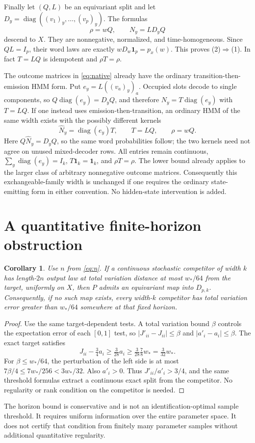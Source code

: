 \documentclass[11pt]{article}
\newtheorem{corollary}[theorem]{Corollary}
\theoremstyle{remark}\newtheorem{remark}[theorem]{Remark}
\newcommand{\one}{\mathbf 1}
\newcommand{\diag}{\operatorname{diag}}
\begin{document}
Finally let $(Q,L)$ be an equivariant split and let $D_y=\diag((v_1)_y,\ldots,(v_p)_y)$. The formulas
\begin{equation}\label{eq:native}
 \rho=wQ,\qquad N_y=LD_yQ
\end{equation}
descend to $X$. They are nonnegative, normalized, and time-homogeneous. Since $QL=I_p$, their word laws are exactly $wD_w\one_p=p_x(w)$. This proves (2)$\Rightarrow$(1). In fact $T=LQ$ is idempotent and $\rho T=\rho$.

The outcome matrices in \eqref{eq:native} already have the ordinary transition-then-emission HMM form. Put $e_y=L((v_a)_y)_a$. Occupied slots decode to single components, so $Q\diag(e_y)=D_yQ$, and therefore $N_y=T\diag(e_y)$ with $T=LQ$. If one instead uses emission-then-transition, an ordinary HMM of the same width exists with the possibly different kernels
\[
 \widehat N_y=\diag(e_y)T,\qquad T=LQ,\qquad\rho=wQ.
\]
Here $Q\widehat N_y=D_yQ$, so the same word probabilities follow; the two kernels need not agree on unused mixed-decoder rows. All entries remain continuous, $\sum_y\diag(e_y)=I_k$, $T\one_k=\one_k$, and $\rho T=\rho$. The lower bound already applies to the larger class of arbitrary nonnegative outcome matrices. Consequently this exchangeable-family width is unchanged if one requires the ordinary state-emitting form in either convention. No hidden-state intervention is added.

\section{A quantitative finite-horizon obstruction}
\begin{corollary}\label{cor:robust}
Use $n$ from \eqref{eq:n}. If a continuous stochastic competitor of width $k$ has length-$2n$ output law at total variation distance at most $w_*/64$ from the target, uniformly on $X$, then $P$ admits an equivariant map into $D_{p,k}$. Consequently, if no such map exists, every width-$k$ competitor has total variation error greater than $w_*/64$ somewhere at that fixed horizon.
\end{corollary}
\begin{proof}
Use the same target-dependent tests. A total variation bound $\beta$ controls the expectation error of each $[0,1]$ test, so $|J'_{ii}-J_{ii}|\leq\beta$ and $|a'_i-a_i|\leq\beta$. The exact target satisfies
\[
 J_{ii}-\tfrac34a_i\geq\tfrac3{28}a_i
 \geq\tfrac3{28}\tfrac78w_*=\tfrac3{32}w_*.
\]
For $\beta\leq w_*/64$, the perturbation of the left side is at most $7\beta/4\leq7w_*/256<3w_*/32$. Also $a'_i>0$. Thus $J'_{ii}/a'_i>3/4$, and the same threshold formulas extract a continuous exact split from the competitor. No regularity or rank condition on the competitor is needed.
\end{proof}
The horizon bound is conservative and is not an identification-optimal sample threshold. It requires uniform information over the entire parameter space. It does not certify that condition from finitely many parameter samples without additional quantitative regularity.
\end{document}
